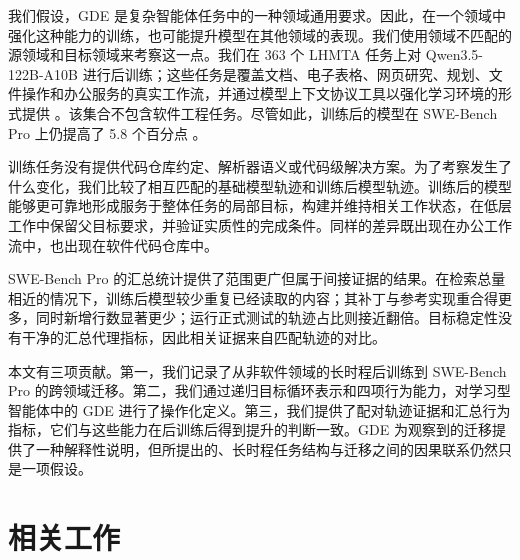 \documentclass[10pt]{article}
\begin{document}
我们假设，GDE 是复杂智能体任务中的一种领域通用要求。因此，在一个领域中强化这种能力的训练，也可能提升模型在其他领域的表现。我们使用领域不匹配的源领域和目标领域来考察这一点。我们在 363 个 LHMTA 任务上对 Qwen3.5-122B-A10B 进行后训练；这些任务是覆盖文档、电子表格、网页研究、规划、文件操作和办公服务的真实工作流，并通过模型上下文协议工具以强化学习环境的形式提供 \citep{anthropic2024mcp}。该集合不包含软件工程任务。尽管如此，训练后的模型在 SWE-Bench Pro 上仍提高了 5.8 个百分点 \citep{deng2025swebenchpro}。

训练任务没有提供代码仓库约定、解析器语义或代码级解决方案。为了考察发生了什么变化，我们比较了相互匹配的基础模型轨迹和训练后模型轨迹。训练后的模型能够更可靠地形成服务于整体任务的局部目标，构建并维持相关工作状态，在低层工作中保留父目标要求，并验证实质性的完成条件。同样的差异既出现在办公工作流中，也出现在软件代码仓库中。

SWE-Bench Pro 的汇总统计提供了范围更广但属于间接证据的结果。在检索总量相近的情况下，训练后模型较少重复已经读取的内容；其补丁与参考实现重合得更多，同时新增行数显著更少；运行正式测试的轨迹占比则接近翻倍。目标稳定性没有干净的汇总代理指标，因此相关证据来自匹配轨迹的对比。

本文有三项贡献。第一，我们记录了从非软件领域的长时程后训练到 SWE-Bench Pro 的跨领域迁移。第二，我们通过递归目标循环表示和四项行为能力，对学习型智能体中的 GDE 进行了操作化定义。第三，我们提供了配对轨迹证据和汇总行为指标，它们与这些能力在后训练后得到提升的判断一致。GDE 为观察到的迁移提供了一种解释性说明，但所提出的、长时程任务结构与迁移之间的因果联系仍然只是一项假设。

\section{相关工作}
\label{sec:related}
\end{document}
